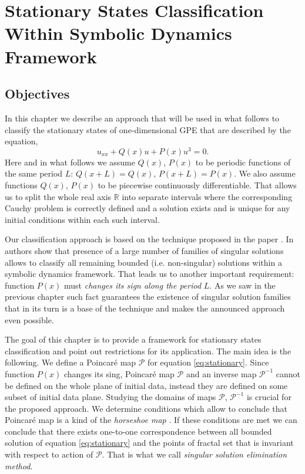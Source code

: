 \chapter{Stationary States Classification Within Symbolic Dynamics Framework}
\label{chapter:II}

\section{Objectives}

In this chapter we describe an approach that will be used in what follows to classify the stationary states of one-dimensional GPE that are described by the equation,
\begin{equation}
	u_{xx} + Q(x) u + P(x) u^3 = 0.
	\label{eq:stationary}
\end{equation}
Here and in what follows we assume $Q(x)$, $P(x)$ to be periodic functions of the same period $L$: $Q(x + L) = Q(x)$, $P(x + L) = P(x)$.
We also assume functions $Q(x)$, $P(x)$ to be piecewise continuously differentiable.
That allows us to split the whole real axis $\mathbb{R}$ into separate intervals where the corresponding Cauchy problem is correctly defined and a solution exists and is unique for any initial conditions within each such interval.

Our classification approach is based on the technique proposed in the paper \cite{AlfimovAvramenko}.
In \cite{AlfimovAvramenko} authors show that presence of a large number of families of singular solutions allows to classify all remaining bounded (i.e. non-singular) solutions within a symbolic dynamics framework.
That leads us to another important requirement: function $P(x)$ must {\it changes its sign along the period} $L$.
As we saw in the previous chapter such fact guarantees the existence of singular solution families that in its turn is a base of the technique and makes the announced approach even possible.

The goal of this chapter is to provide a framework for stationary states classification and point out restrictions for its application.
The main idea is the following.
We define a Poincar\'e map $\mathcal{P}$ for equation \eqref{eq:stationary}.
Since function $P(x)$ changes its sing, Poincar\'e map $\mathcal{P}$ and an inverse map $\mathcal{P}^{-1}$ cannot be defined on the whole plane of initial data, instead they are defined on some subset of initial data plane.
Studying the domains of maps $\mathcal{P}$, $\mathcal{P}^{-1}$ is crucial for the proposed approach.
We determine conditions which allow to conclude that Poincar\'e map is a kind of the {\it horseshoe map} \cite[Chapter 5]{GuekenheimerHolmes}.
If these conditions are met we can conclude that there exists one-to-one correspondence between all bounded solution of equation \eqref{eq:stationary} and the points of fractal set that is invariant with respect to action of $\mathcal{P}$.
That is what we call {\it singular solution elimination method}.


